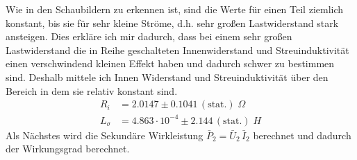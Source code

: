 \documentclass[a4paper, 12pt,]{scrartcl}
\begin{document}
Wie in den Schaubildern zu erkennen ist, sind die Werte für einen Teil ziemlich konstant, bis sie für sehr kleine Ströme, d.h. sehr großen Lastwiderstand stark ansteigen. Dies erkläre ich mir dadurch, dass bei einem sehr großen Lastwiderstand die in Reihe geschalteten Innenwiderstand und Streuinduktivität einen verschwindend kleinen Effekt haben und dadurch schwer zu bestimmen sind. Deshalb mittele ich Innen Widerstand und Streuinduktivität über den Bereich in dem sie relativ konstant sind.
\begin{align*}R_i&=2.0147\pm0.1041\,(\text{stat.})\;\Omega\\
L_\sigma&=4.863\cdot10^{-4}\pm2.144\,(\text{stat.})\;H\end{align*}
Als Nächstes wird die Sekundäre Wirkleistung $\bar{P}_2=\bar{U}_2\,\bar{I}_2$ berechnet und dadurch der Wirkungsgrad berechnet.
\end{document}

